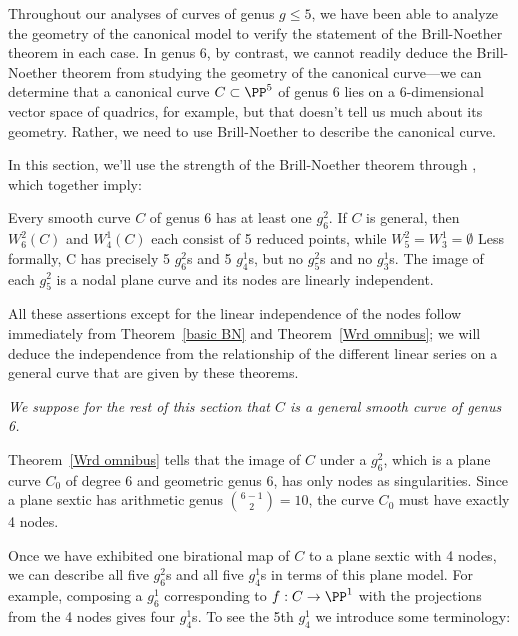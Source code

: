 Throughout our analyses of curves of genus $g \leq 5$, we have been able to analyze the geometry of the canonical model to verify the statement of the Brill-Noether theorem in each case. In genus 6, by contrast, we cannot readily deduce the Brill-Noether theorem from studying the geometry of the canonical curve---we can determine that a canonical curve $C \subset \PP^5$ of genus 6 lies on a 6-dimensional vector space of quadrics, for example, but that doesn't tell us much about its geometry. Rather, we need to use Brill-Noether to describe the canonical curve. 

In this section, we'll use the  strength of the Brill-Noether theorem through , which together imply:

\begin{theorem}\label{BN consequences}
Every smooth curve $C$ of genus 6 has at least one $g^{2}_{6}$. If $C$ is general, then
$W^{2}_{6}(C)$ and $W^{1}_{4}(C)$ each consist of 5 reduced points, while $W^{2}_{5} = W^{1}_{3} = \emptyset$  Less formally, C has precisely 5 $g^{2}_{6}$s and 5 $g^{1}_{4}$s, but no $g^{2}_{5}$s and no $g^{1}_{3}$s. The image of each $g^{2}_{5}$ is a nodal plane curve and its nodes are linearly independent.
\end{theorem}

All these assertions except for the linear independence of the nodes follow immediately from 
Theorem~\ref{basic BN} and
Theorem~\ref{Wrd omnibus}; we will deduce the independence from the relationship of the different
linear series on a general curve that are given by these theorems.


\emph{We suppose for the rest of this section that $C$ is a general smooth curve of genus 6.}

Theorem~\ref{Wrd omnibus} tells that the image of $C$ under a $g^{2}_{6}$, which is a plane curve $C_{0}$ of degree 6 and
geometric genus 6, has only nodes
as singularities. Since a plane sextic has arithmetic genus $\binom{6-1}{2} = 10$, the curve $C_{0}$
must have exactly 4 nodes.

Once we have exhibited one birational map of $C$ to a plane sextic with 4 nodes, we can describe all five $g^2_6$s and all five $g^1_4$s in terms of this plane model. For example, composing a $g^1_6$ corresponding to $f: C\to \PP^1$ with the projections from the 4 nodes gives four $g^1_4$s. To see the 5th $g^{1}_{4}$ we introduce some terminology:

